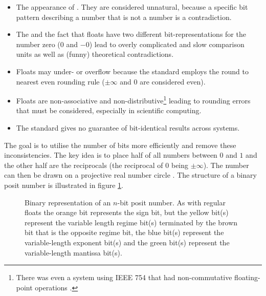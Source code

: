 \documentclass{article}
\theoremstyle{plain} %
\theoremstyle{convention} %
\theoremstyle{remark} %
\numberwithin{equation}{section}
\begin{document}
\begin{itemize}
    \item The appearance of . They are considered unnatural, because a specific bit pattern describing a number that is not a number is a contradiction.
    \item The  and the fact that floats have two different bit-representations for the number zero ($0$ and $-0$) lead to overly complicated and slow comparison units as well as (funny) theoretical contradictions\footnotemark.


    \item Floats may under- or overflow because the standard employs the round to nearest even rounding rule ($\pm \infty$ and $0$ are considered even).
    \item Floats are non-associative and non-distributive\footnote{There was even a system using IEEE 754 that had non-commutative floating-point operations \cite{cody1980}.} leading to rounding errors that must be considered, especially in scientific computing.
    \item The standard gives no guarantee of bit-identical results across systems.
\end{itemize}


The goal is to utilise the number of bits more efficiently and remove these inconsistencies. The key idea is to place half of all numbers between $0$ and $1$ and the other half are the reciprocals (the reciprocal of $0$ being $\pm \infty$). The number can then be drawn on a projective real number circle \cite{gustafson2017}. The structure of a binary posit number is illustrated in figure \ref{fig:posit}.

\begin{figure}[H]
  \caption{Binary representation of an $n$-bit posit number. As with regular floats the \textcolor{corange}{orange} bit represents the \textcolor{corange}{sign bit}, but the \textcolor{cyellow}{yellow} bit(s) represent the variable length \textcolor{cyellow}{regime bit(s)} terminated by the \textcolor{cbrown}{brown} bit that is the \textcolor{cbrown}{opposite regime bit}, the \textcolor{cblue}{blue} bit(s) represent the variable-length \textcolor{cblue}{exponent bit(s)} and the \textcolor{cgreen}{green} bit(s) represent the variable-length \textcolor{cgreen}{mantissa bit(s)}.}
  \label{fig:posit}
\end{figure}
\end{document}
